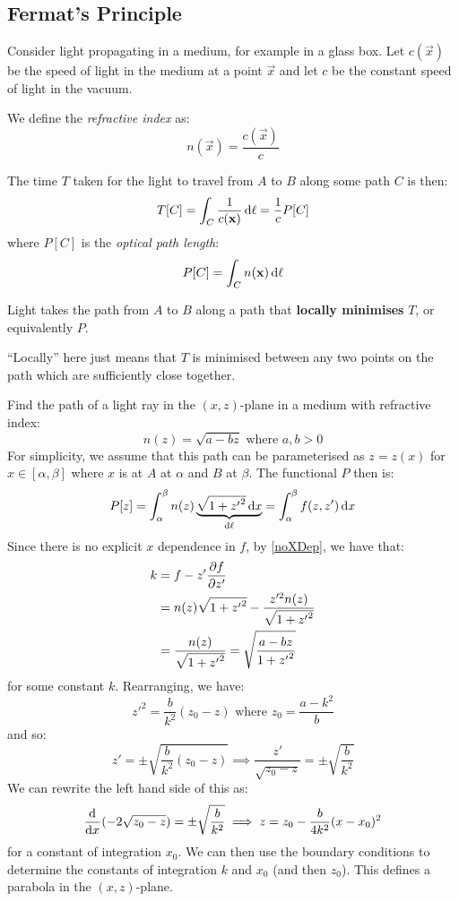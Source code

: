 \documentclass[../main.tex]{subfiles}
\begin{document}
\subsection{Fermat's Principle}
Consider light propagating in a medium, for example in a glass box.
Let $c(\vec{x})$ be the speed of light in the medium at a point $\vec{x}$ and let $c$ be the constant speed of light in the vacuum.
\begin{definition}
  We define the \textit{refractive index} as:
  \[
    n(\vec{x}) = \frac{c(\vec{x})}{c}
  \]
\end{definition}
The time $T$ taken for the light to travel from $A$ to $B$ along some path $C$ is then:
\[
  T[C] = \int_{C} \frac{1}{c(\vec{x})} \d{\ell} = \frac{1}{c} P[C]
\]
where $P[C]$ is the \textit{optical path length}:
\[
  P[C] = \int_{C} n(\vec{x}) \d{\ell}
\]
\begin{law}
  Light takes the path from $A$ to $B$ along a path that \textbf{locally minimises} $T$, or equivalently $P$.
\end{law}
\begin{remark}
  ``Locally'' here just means that $T$ is minimised between any two points on the path which are sufficiently close together.
\end{remark}
\begin{example}
  Find the path of a light ray in the $(x, z)$-plane in a medium with refractive index:
  \[
    n(z) = \sqrt{a - bz} \text{ where } a, b > 0
  \]
  For simplicity, we assume that this path can be parameterised as $z = z(x)$ for $x \in [\alpha, \beta]$ where $x$ is at $A$ at $\alpha$ and $B$ at $\beta$.
  The functional $P$ then is:
  \[
    P[z] = \int_{\alpha}^{\beta} n(z) \underbrace{\sqrt{1 + {z'}^2} \d{x}}_{\d{\ell}} = \int_{\alpha}^{\beta} f(z, z') \d{x}
  \]
  Since there is no explicit $x$ dependence in $f$, by \cref{noXDep}, we have that:
  \begin{align*}
    k &= f - z' \pderiv{f}{z'} \\
      &= n(z)\sqrt{1 + {z'}^2} - \frac{z'^2 n(z)}{\sqrt{1 + {z'}^2}} \\
      &= \frac{n(z)}{\sqrt{1 + {z'}^2}} = \sqrt{\frac{a - bz}{1 + {z'}^2}}
  \end{align*}
  for some constant $k$.
  Rearranging, we have:
  \[
    {z'}^2 = \frac{b}{k^2}(z_0 - z) \text{ where } z_0 = \frac{a - k^2}{b}
  \]
  and so:
  \[
    z' = \pm \sqrt{\frac{b}{k^2}(z_0 - z)} \implies \frac{z'}{\sqrt{z_0 - z}} = \pm \sqrt{\frac{b}{k^2}}
  \]
  We can rewrite the left hand side of this as:
  \[
    \deriv{}{x}(- 2 \sqrt{z_0 - z}) = \pm\sqrt{\frac{b}{k^2}} \implies z = z_0 - \frac{b}{4k^2}(x - x_0)^2
  \]
  for a constant of integration $x_0$.
  We can then use the boundary conditions to determine the constants of integration $k$ and $x_0$ (and then $z_0$).
  This defines a parabola in the $(x, z)$-plane.
\end{example}
\end{document}
